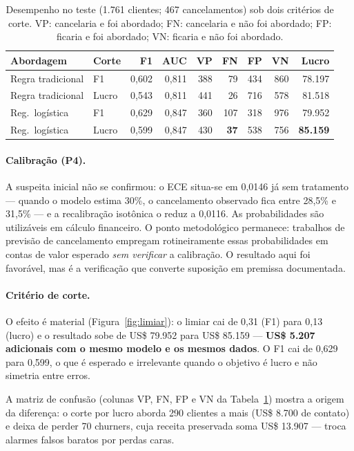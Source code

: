 \documentclass[10pt,a4paper]{article}
\begin{document}
\begin{table}[t]
\centering
\small
\caption{Desempenho no teste (1.761 clientes; 467 cancelamentos) sob dois critérios de corte. VP: cancelaria e foi abordado; FN: cancelaria e não foi abordado; FP: ficaria e foi abordado; VN: ficaria e não foi abordado.}
\label{tab:predicao}
\begin{tabular}{@{}llrrrrrrr@{}}
\toprule
\textbf{Abordagem} & \textbf{Corte} & \textbf{F1} & \textbf{AUC} & \textbf{VP} & \textbf{FN} & \textbf{FP} & \textbf{VN} & \textbf{Lucro} \\
\midrule
Regra tradicional & F1    & 0,602 & 0,811 & 388 &  79 & 434 & 860 & 78.197 \\
Regra tradicional & Lucro & 0,543 & 0,811 & 441 &  26 & 716 & 578 & 81.518 \\
Reg.\ logística   & F1    & 0,629 & 0,847 & 360 & 107 & 318 & 976 & 79.952 \\
Reg.\ logística   & Lucro & 0,599 & 0,847 & 430 &  \textbf{37} & 538 & 756 & \textbf{85.159} \\
\bottomrule
\end{tabular}
\end{table}

\paragraph{Calibração (P4).} A suspeita inicial não se confirmou: o ECE situa-se em 0,0146 já
sem tratamento --- quando o modelo estima 30\%, o cancelamento observado fica entre 28,5\% e
31,5\% --- e a recalibração isotônica o reduz a 0,0116. As probabilidades são utilizáveis em
cálculo financeiro. O ponto metodológico permanece: trabalhos de previsão de cancelamento
empregam rotineiramente essas probabilidades em contas de valor esperado \emph{sem verificar}
a calibração. O resultado aqui foi favorável, mas é a verificação que converte suposição em
premissa documentada.

\paragraph{Critério de corte.} O efeito é material (Figura~\ref{fig:limiar}): o limiar cai de
0,31 (F1) para 0,13 (lucro) e o resultado sobe de US\$ 79.952 para US\$ 85.159 ---
\textbf{US\$ 5.207 adicionais com o mesmo modelo e os mesmos dados}. O F1 cai de 0,629 para
0,599, o que é esperado e irrelevante quando o objetivo é lucro e não simetria entre erros.

A matriz de confusão (colunas VP, FN, FP e VN da Tabela~\ref{tab:predicao}) mostra a origem da
diferença: o corte por lucro aborda 290 clientes a mais (US\$ 8.700 de contato) e deixa de perder
70 churners, cuja receita preservada soma US\$ 13.907 --- troca alarmes falsos baratos por perdas
caras.
\end{document}
